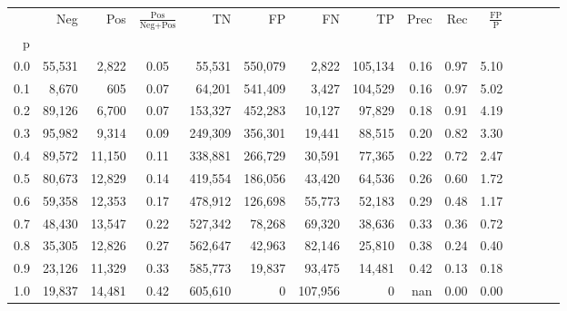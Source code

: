 \begin{tabular}{rrrcrrrrrrrrrrr}
\toprule
{} &     Neg &     Pos & $\frac{\text{Pos}}{\text{Neg}+\text{Pos}}$ &       TN &       FP &       FN &       TP &  Prec &   Rec & $\frac{\text{FP}}{\text{P}}$ \\
p   &         &         &                                            &          &          &          &          &       &       &                              \\
\midrule
0.0 &  55,531 &   2,822 &                                       0.05 &   55,531 &  550,079 &    2,822 &  105,134 &  0.16 &  0.97 &                         5.10 \\
0.1 &   8,670 &     605 &                                       0.07 &   64,201 &  541,409 &    3,427 &  104,529 &  0.16 &  0.97 &                         5.02 \\
0.2 &  89,126 &   6,700 &                                       0.07 &  153,327 &  452,283 &   10,127 &   97,829 &  0.18 &  0.91 &                         4.19 \\
0.3 &  95,982 &   9,314 &                                       0.09 &  249,309 &  356,301 &   19,441 &   88,515 &  0.20 &  0.82 &                         3.30 \\
0.4 &  89,572 &  11,150 &                                       0.11 &  338,881 &  266,729 &   30,591 &   77,365 &  0.22 &  0.72 &                         2.47 \\
0.5 &  80,673 &  12,829 &                                       0.14 &  419,554 &  186,056 &   43,420 &   64,536 &  0.26 &  0.60 &                         1.72 \\
0.6 &  59,358 &  12,353 &                                       0.17 &  478,912 &  126,698 &   55,773 &   52,183 &  0.29 &  0.48 &                         1.17 \\
0.7 &  48,430 &  13,547 &                                       0.22 &  527,342 &   78,268 &   69,320 &   38,636 &  0.33 &  0.36 &                         0.72 \\
0.8 &  35,305 &  12,826 &                                       0.27 &  562,647 &   42,963 &   82,146 &   25,810 &  0.38 &  0.24 &                         0.40 \\
0.9 &  23,126 &  11,329 &                                       0.33 &  585,773 &   19,837 &   93,475 &   14,481 &  0.42 &  0.13 &                         0.18 \\
1.0 &  19,837 &  14,481 &                                       0.42 &  605,610 &        0 &  107,956 &        0 &   nan &  0.00 &                         0.00 \\
\bottomrule
\end{tabular}
